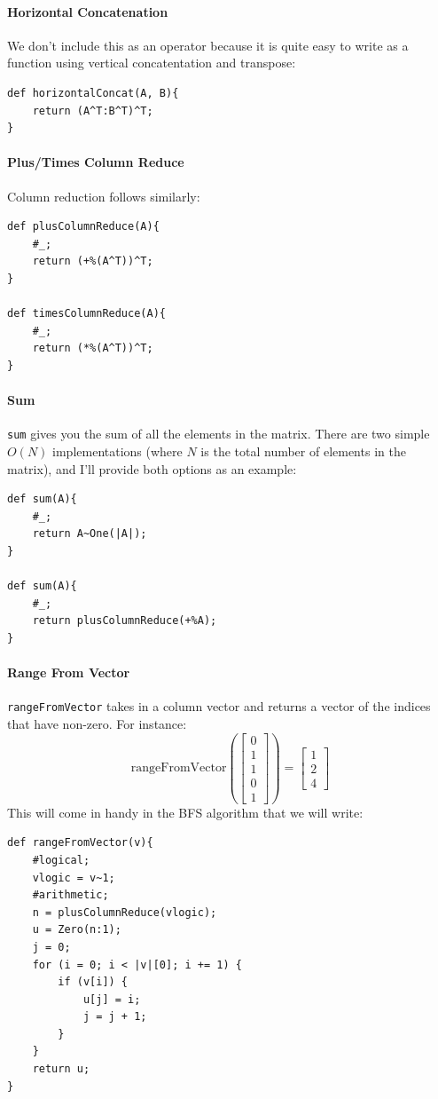 \paragraph{Horizontal Concatenation}
We don't include this as an operator because it is quite easy to write as a function using vertical concatentation and transpose:
\begin{lstlisting}
def horizontalConcat(A, B){
    return (A^T:B^T)^T;
}
\end{lstlisting}

\paragraph{Plus/Times Column Reduce}
Column reduction follows similarly:
\begin{lstlisting}
def plusColumnReduce(A){
    #_;
    return (+%(A^T))^T;
}

def timesColumnReduce(A){
    #_;
    return (*%(A^T))^T;
}
\end{lstlisting}

\paragraph{Sum}
\verb=sum= gives you the sum of all the elements in the matrix.  There are two simple $O(N)$ implementations (where $N$ is the total number of elements in the matrix), and I'll provide both options as an example:
\begin{lstlisting}
def sum(A){
    #_;
    return A~One(|A|);
}

def sum(A){
    #_;
    return plusColumnReduce(+%A);
}
\end{lstlisting}

\paragraph{Range From Vector}
\verb=rangeFromVector= takes in a column vector and returns a vector of the indices that have non-zero.  For instance:
$$\text{rangeFromVector}(\begin{bmatrix}
0 \\ 1 \\ 1 \\ 0 \\ 1
\end{bmatrix})
=
\begin{bmatrix}
1\\2\\4
\end{bmatrix}
$$
This will come in handy in the BFS algorithm that we will write:
\begin{lstlisting}
def rangeFromVector(v){
    #logical;
    vlogic = v~1;
    #arithmetic;
    n = plusColumnReduce(vlogic);
    u = Zero(n:1);
    j = 0;
    for (i = 0; i < |v|[0]; i += 1) {
        if (v[i]) {
            u[j] = i;
            j = j + 1;
        }
    }
    return u;
}
\end{lstlisting}



